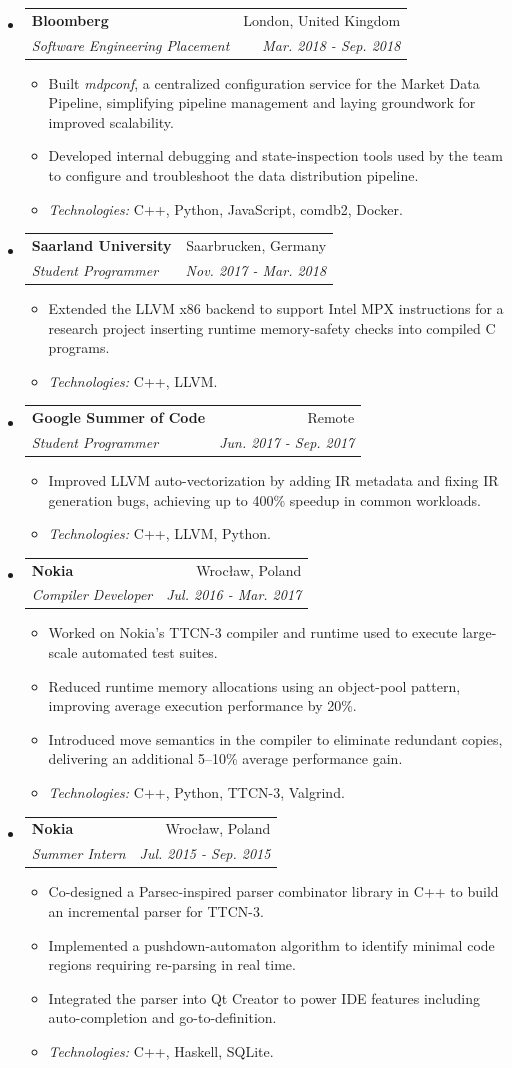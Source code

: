 \documentclass[letterpaper,11pt]{article}
\makeatletter
\newcommand{\resitem}[1]{\item #1 \vspace{-2pt}}
\newcommand{\ressubheading}[4]{
\begin{tabular*}{6.5in}{l@{\extracolsep{\fill}}r}
		\textbf{#1} & #2 \\
		\textit{#3} & \textit{#4} \\
\end{tabular*}\vspace{-6pt}}
\makeatother
\begin{document}
\begin{itemize}
\item
	\ressubheading{Bloomberg}{London, United Kingdom}{Software Engineering Placement}{Mar. 2018 - Sep. 2018}
	\begin{itemize}
		\resitem{Built \textit{mdpconf}, a centralized configuration service for the Market Data Pipeline, simplifying pipeline management and laying groundwork for improved scalability.}
		\resitem{Developed internal debugging and state-inspection tools used by the team to configure and troubleshoot the data distribution pipeline.}
		\resitem{\textit{Technologies:} C++, Python, JavaScript, comdb2, Docker.}
	\end{itemize}
	
\item
	\ressubheading{Saarland University}{Saarbrucken, Germany}{Student Programmer}{Nov. 2017 - Mar. 2018}
	\begin{itemize}
		\resitem{Extended the LLVM x86 backend to support Intel MPX instructions for a research project inserting runtime memory-safety checks into compiled C programs.}
		\resitem{\textit{Technologies:} C++, LLVM.}
	\end{itemize}
\item
	\ressubheading{Google Summer of Code}{Remote}{Student Programmer}{Jun. 2017 - Sep. 2017}
	\begin{itemize}
		\resitem{Improved LLVM auto-vectorization by adding IR metadata and fixing IR generation bugs, achieving up to 400\% speedup in common workloads.}
		\resitem{\textit{Technologies:} C++, LLVM, Python.}
	\end{itemize}
\item
	\ressubheading{Nokia}{Wroc\l{}aw, Poland}{Compiler Developer}{Jul. 2016 - Mar. 2017}
	\begin{itemize}
		\resitem{Worked on Nokia's TTCN-3 compiler and runtime used to execute large-scale automated test suites.}
		\resitem{Reduced runtime memory allocations using an object-pool pattern, improving average execution performance by 20\%.}
		\resitem{Introduced move semantics in the compiler to eliminate redundant copies, delivering an additional 5--10\% average performance gain.}
		\resitem{\textit{Technologies:} C++, Python, TTCN-3, Valgrind.}
	\end{itemize}
\item
	\ressubheading{Nokia}{Wroc\l{}aw, Poland}{Summer Intern}{Jul. 2015 - Sep. 2015}
	\begin{itemize}
		\resitem{Co-designed a Parsec-inspired parser combinator library in C++ to build an incremental parser for TTCN-3.}
		\resitem{Implemented a pushdown-automaton algorithm to identify minimal code regions requiring re-parsing in real time.}
		\resitem{Integrated the parser into Qt Creator to power IDE features including auto-completion and go-to-definition.}
		\resitem{\textit{Technologies:} C++, Haskell, SQLite.}
	\end{itemize}
\end{itemize}
\end{document}
